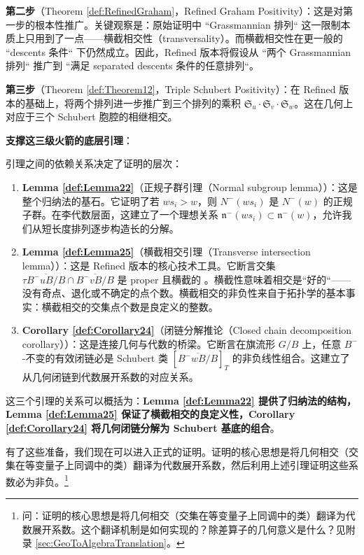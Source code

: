 \textbf{第二步}（Theorem \cref{def:RefinedGraham}，Refined Graham Positivity）：这是对第一步的根本性推广。关键观察是：原始证明中 ``Grassmannian 排列`` 这一限制本质上只用到了一点——横截相交性（transversality）。而横截相交性在更一般的 ``descents 条件`` 下仍然成立。因此，Refined 版本将假设从 ``两个 Grassmannian 排列`` 推广到 ``满足 separated descents 条件的任意排列``。

\textbf{第三步}（Theorem \cref{def:Theorem12}，Triple Schubert Positivity）：在 Refined 版本的基础上，将两个排列进一步推广到三个排列的乘积 $\mathfrak{S}_u \cdot \mathfrak{S}_v \cdot \mathfrak{S}_w$。这在几何上对应于三个 Schubert 胞腔的相继相交。

\textbf{支撑这三级火箭的底层引理}：

引理之间的依赖关系决定了证明的层次：

\begin{enumerate}
\item \textbf{Lemma \cref{def:Lemma22}}（正规子群引理（Normal subgroup lemma））：这是整个归纳法的基石。它证明了若 $ws_i > w$，则 $N^-(ws_i)$ 是 $N^-(w)$ 的正规子群。在李代数层面，这建立了一个理想关系 $\mathfrak{n}^-(ws_i) \subset \mathfrak{n}^-(w)$，允许我们从短长度排列逐步构造长的分解。

\item \textbf{Lemma \cref{def:Lemma25}}（横截相交引理（Transverse intersection lemma））：这是 Refined 版本的核心技术工具。它断言交集 $\tau \overline{B^-uB/B} \cap \overline{B^-vB/B}$ 是 proper 且横截的%
%
%
。横截性意味着相交是``好的``——没有奇点、退化或不确定的点个数。横截相交的非负性来自于拓扑学的基本事实：横截相交的交集点个数是良定义的整数。

\item \textbf{Corollary \cref{def:Corollary24}}（闭链分解推论（Closed chain decomposition corollary））：这是连接几何与代数的桥梁。它断言在旗流形 $G/B$ 上，任意 $B^-$-不变的有效闭链必是 Schubert 类 $[\overline{B^-wB/B}]_T$ 的非负线性组合。这建立了从几何闭链到代数展开系数的对应关系。
\end{enumerate}

这三个引理的关系可以概括为：\textbf{Lemma \cref{def:Lemma22} 提供了归纳法的结构，Lemma \cref{def:Lemma25} 保证了横截相交的良定义性，Corollary \cref{def:Corollary24} 将几何闭链分解为 Schubert 基底的组合}。

有了这些准备，我们现在可以进入正式的证明。证明的核心思想是将几何相交（交集在等变量子上同调中的类）翻译为代数展开系数，然后利用上述引理证明这些系数必为非负。\footnote{问：证明的核心思想是将几何相交（交集在等变量子上同调中的类）翻译为代数展开系数。这个翻译机制是如何实现的？除差算子的几何意义是什么？见附录 \cref{sec:GeoToAlgebraTranslation}。}

